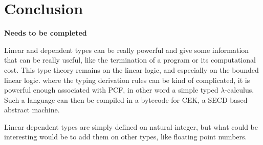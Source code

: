 \documentclass[a4paper,12pt]{article}
\begin{document}
\section{Conclusion}

\textbf{Needs to be completed}

\medskip

Linear and dependent types can be really powerful and give some information
that can be really useful, like the termination of a program or its
computational cost. This type theory remains on the linear logic, and especially
on the bounded linear logic. where the typing derivation rules can be kind of
complicated, it is powerful enough associated with PCF, in other word a simple
typed $\lambda$-calculus. Such a language can then be compiled in a bytecode for
CEK, a SECD-based abstract machine. 

Linear dependent types are simply defined on natural integer, but what could be
interesting would be to add them on other types, like floating point numbers.




\end{document}
